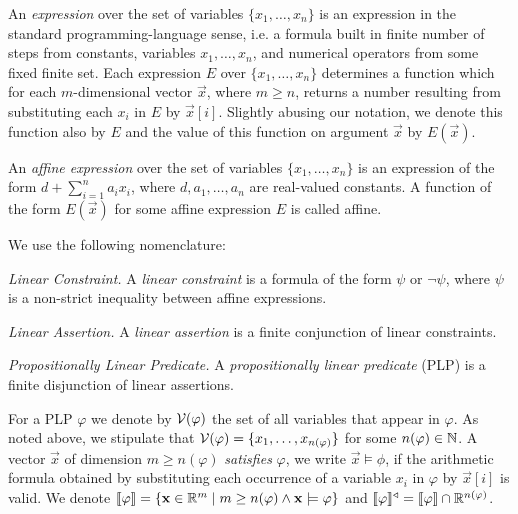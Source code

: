 \smallskip{}
An \emph{expression} over the set of variables $\{x_1,\dots,x_n\}$ 
is an expression in the standard programming-language sense, i.e. a formula 
built in finite number of steps from constants, variables $x_1,\dots,x_n$, and 
numerical operators from some fixed finite set. Each expression $E$ over 
$\{x_1,\dots,x_n\}$ 
determines a function which for each $m$-dimensional vector $\vec{x}$, where 
$m\geq n$,  
returns a number resulting from substituting each $x_i$ in $E$ by $\vec{x}[i]$. 
Slightly abusing our notation, we denote this function also by $E$ and the 
value of this function on argument $\vec{x}$ by $E(\vec{x})$. 

\smallskip{}
An \emph{affine expression} over the set of variables $\{x_1,\dots,x_n\}$ is an 
expression of the form $d+\sum_{i=1}^{n}a_i
x_i$, where  $d,a_1,\dots,a_n$ are real-valued
constants.  A function of the form $E(\vec{x})$ for some affine expression $E$ 
is called affine.

\smallskip{}
We use the following nomenclature:
\begin{compactitem}
\item {\em Linear Constraint.} A \emph{linear constraint} is a formula of the
form $\psi$ or $\neg\psi$, where  $\psi$ is a non-strict inequality
between affine expressions.
\item {\em Linear Assertion.} A \emph{linear assertion} is a finite conjunction
of linear constraints.
\item {\em Propositionally Linear Predicate.}
A  \emph{propositionally linear predicate} (PLP) is a finite disjunction of
linear assertions.
\end{compactitem}

For a PLP $\varphi$ we denote by $\mathcal{V}(\varphi)$ the set of all variables that 
appear in $\varphi$. As noted above, we stipulate that $\mathcal{V}(\varphi)=\{x_1,\dots,x_{n(\varphi)}\}$ for some $n(\varphi)\in \mathbb{N}$. A vector $\vec{x}$ of dimension $m\geq n(\varphi)$ \emph{satisfies} $\varphi$, we write 
$\vec{x}\models\phi$, if 
 the arithmetic formula obtained by 
substituting each occurrence of a variable $x_i$ in $\varphi$ by $\vec{x}[i]$ is 
valid. We denote $\llbracket \varphi \rrbracket = \{\mathbf{x}\in \mathbb{R}^m\mid m\geq n(\varphi) \wedge \mathbf{x} \models\varphi\}$ 
and $\llbracket \varphi \rrbracket^{\triangleleft} = \llbracket \varphi \rrbracket
\cap \mathbb{R}^{n(\varphi)}$. 


